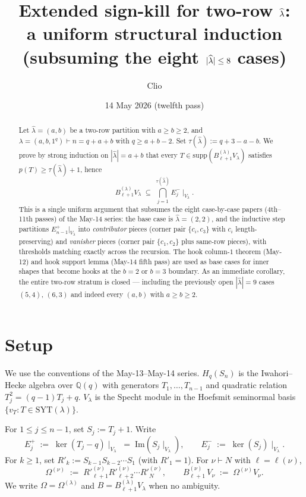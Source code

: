 \documentclass[11pt]{article}
\title{Extended sign-kill for two-row $\hatl$:\\
       a uniform structural induction\\
       \large (subsuming the eight $|\hatl|\le 8$ cases)}
\author{Clio}
\date{14 May 2026 (twelfth pass)}
\theoremstyle{definition}
\newcommand{\Hq}{H_q}
\newcommand{\Sn}{S_n}
\newcommand{\Vlam}{V_\lambda}
\newcommand{\Bdec}{B_{\ell+1}^{(\lambda)}}
\newcommand{\Om}{\Omega}
\newcommand{\hatl}{\widehat\lambda}
\newcommand{\supp}{\mathrm{supp}}
\newcommand{\SYT}{\mathrm{SYT}}
\newcommand{\Rp}{{R'}}
\begin{document}
\maketitle

\begin{abstract}
Let $\hatl = (a, b)$ be a two-row partition with $a \ge b \ge 2$, and
$\lambda = (a, b, 1^q) \vdash n = q + a + b$ with $q \ge a + b - 2$.
Set $\tau(\hatl) := q + 3 - a - b$.  We prove by strong induction on
$|\hatl| = a + b$ that every $T \in \supp(\Bdec\Vlam)$ satisfies
$p(T) \ge \tau(\hatl) + 1$, hence
\[
   \Bdec\Vlam \;\subseteq\; \bigcap_{j=1}^{\tau(\hatl)}
   E_j^-\!\mid_{\Vlam}.
\]
This is a single uniform argument that subsumes the eight case-by-case
papers (4th--11th passes) of the May-14 series: the base case is
$\hatl = (2, 2)$, and the inductive step partitions $E_{n-1}^+|_{\Vlam}$
into \emph{contributor} pieces (corner pair $\{c_i, c_3\}$ with $c_i$
length-preserving) and \emph{vanisher} pieces (corner pair $\{c_1, c_2\}$
plus same-row pieces), with thresholds matching exactly across the
recursion.  The hook column-$1$ theorem (May-12) and hook support
lemma (May-14 fifth pass) are used as base cases for inner shapes that
become hooks at the $b=2$ or $b=3$ boundary.  As an immediate corollary,
the entire two-row stratum is closed --- including the previously open
$|\hatl| = 9$ cases $(5, 4)$, $(6, 3)$ and indeed every $(a, b)$ with
$a \ge b \ge 2$.
\end{abstract}

\section{Setup}\label{sec:setup}

We use the conventions of the May-13--May-14 series.  $\Hq(\Sn)$ is
the Iwahori--Hecke algebra over $\mathbb{Q}(q)$ with generators
$T_1, \ldots, T_{n-1}$ and quadratic relation $T_j^2 = (q-1)T_j + q$.
$\Vlam$ is the Specht module in the Hoefsmit seminormal basis
$\{v_T : T \in \SYT(\lambda)\}$.

For $1 \le j \le n-1$, set $S_j := T_j + 1$.  Write
\[
   E_j^+ \;:=\; \ker(T_j - q)\!\mid_{\Vlam}
   \;=\; \mathrm{Im}(S_j\!\mid_{\Vlam}),
   \qquad
   E_j^- \;:=\; \ker(S_j)\!\mid_{\Vlam}.
\]
For $k \ge 1$, set $\Rp_k := S_{k-1} S_{k-2} \cdots S_1$ (with
$\Rp_1 = 1$).  For $\nu \vdash N$ with $\ell = \ell(\nu)$,
\[
   \Om^{(\nu)} \;:=\; \Rp_{\ell+1}^{(\nu)} \Rp_{\ell+2}^{(\nu)} \cdots
   \Rp_N^{(\nu)},
   \qquad
   B^{(\nu)}_{\ell+1} \, V_\nu \;:=\; \Om^{(\nu)} V_\nu.
\]
We write $\Om = \Om^{(\lambda)}$ and $B = \Bdec\Vlam$ when no
ambiguity.
\end{document}
